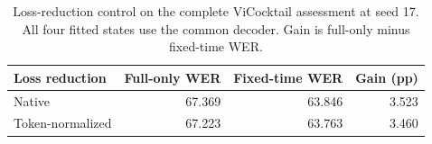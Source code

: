 \begin{table}[tbp]
\centering\small
\caption{Loss-reduction control on the complete ViCocktail assessment at seed 17.
All four fitted states use the common decoder. Gain is full-only minus fixed-time WER.}
\label{tab:reduction}
\begin{tabular}{lrrr}
\toprule
Loss reduction & Full-only WER & Fixed-time WER & Gain (pp)\\
\midrule
Native & 67.369 & 63.846 & 3.523\\
Token-normalized & 67.223 & 63.763 & 3.460\\
\bottomrule
\end{tabular}
\end{table}
